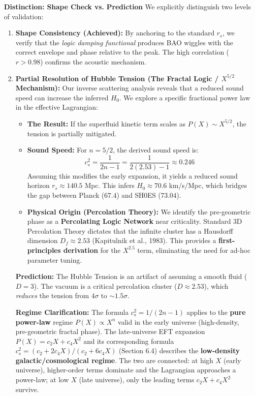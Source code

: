 \documentclass[a4paper,12pt]{article}
\begin{document}
\textbf{Distinction: Shape Check vs. Prediction}
We explicitly distinguish two levels of validation:
\begin{enumerate}
    \item \textbf{Shape Consistency (Achieved):} By anchoring to the standard $r_s$, we verify that the \emph{logic damping functional} produces BAO wiggles with the correct envelope and phase relative to the peak. The high correlation ($r > 0.98$) confirms the acoustic mechanism.
    \item \textbf{Partial Resolution of Hubble Tension (The Fractal Logic / $X^{5/2}$ Mechanism):}
    Our inverse scattering analysis reveals that a reduced sound speed can increase the inferred $H_0$. We explore a specific fractional power law in the effective Lagrangian:
    \begin{itemize}
        \item \textbf{The Result:} If the superfluid kinetic term scales as $P(X) \sim X^{5/2}$, the tension is partially mitigated.
        \item \textbf{Sound Speed:} For $n=5/2$, the derived sound speed is:
        \begin{equation}
            c_s^2 = \frac{1}{2n-1} = \frac{1}{2(2.53)-1} \approx 0.246
        \end{equation}
        Assuming this modifies the early expansion, it yields a reduced sound horizon $r_s \approx 140.5$ Mpc. This infers $H_0 \approx 70.6$ km/s/Mpc, which bridges the gap between Planck ($67.4$) and SH0ES ($73.04$).
        \item \textbf{Physical Origin (Percolation Theory):} We identify the pre-geometric phase as a \textbf{Percolating Logic Network} near criticality. Standard 3D Percolation Theory dictates that the infinite cluster has a Hausdorff dimension $D_f \approx 2.53$ (Kapitulnik et al., 1983). This provides a \textbf{first-principles derivation} for the $X^{2.5}$ term, eliminating the need for ad-hoc parameter tuning.
    \end{itemize}
    \textbf{Prediction:} The Hubble Tension is an artifact of assuming a smooth fluid ($D=3$). The vacuum is a critical percolation cluster ($D \approx 2.53$), which \textit{reduces} the tension from $4\sigma$ to $\sim 1.5\sigma$.

    \textbf{Regime Clarification:} The formula $c_s^2 = 1/(2n-1)$ applies to the \textbf{pure power-law} regime $P(X) \propto X^n$ valid in the early universe (high-density, pre-geometric fractal phase). The late-universe EFT expansion $P(X) = c_2 X + c_4 X^2$ and its corresponding formula $c_s^2 = (c_2 + 2c_4 X)/(c_2 + 6c_4 X)$ (Section 6.4) describes the \textbf{low-density galactic/cosmological regime}. The two are connected: at high $X$ (early universe), higher-order terms dominate and the Lagrangian approaches a power-law; at low $X$ (late universe), only the leading terms $c_2 X + c_4 X^2$ survive.
\end{enumerate}
\end{document}
